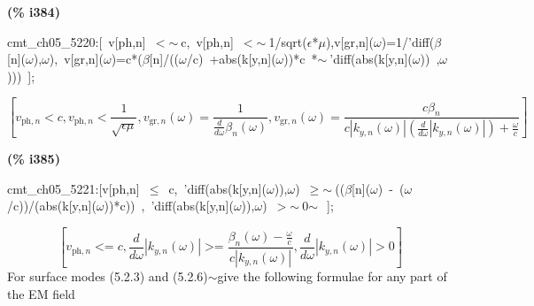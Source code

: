 \documentclass[fleqn]{article}
\begin{document}
\noindent
\begin{minipage}[t]{4.000000em}\color{red}\bfseries
(\% i384)	
\end{minipage}
\begin{minipage}[t]{\textwidth}\color{blue}
cmt\_ch05\_5220:[\ v[ph,n]\ \ensuremath{<}\ensuremath{\sim\ }c,\ v[ph,n]\ \ensuremath{<}\ensuremath{\sim\ }1/sqrt(\ensuremath{\epsilon}*\ensuremath{\mu}),v[gr,n](\ensuremath{\omega})=1/'diff(\ensuremath{\beta}[n](\ensuremath{\omega}),\ensuremath{\omega}),\ v[gr,n](\ensuremath{\omega})=c*(\ensuremath{\beta}[n]/((\ensuremath{\omega}/c)\ +abs(k[y,n](\ensuremath{\omega}))*c\ *\ensuremath{\sim\ }'diff(abs(k[y,n](\ensuremath{\omega}))\ ,\ensuremath{\omega})))\ ];
\end{minipage}
\[\displaystyle \tag{\% o384} 
\operatorname{[}{v_{\ensuremath{\mathrm{ph}},n}}\operatorname{<  }c\operatorname{,}{v_{\ensuremath{\mathrm{ph}},n}}\operatorname{<  }\frac{1}{\sqrt{\epsilon  \mu }}\operatorname{,}{v_{\ensuremath{\mathrm{gr}},n}}\left( \omega \right) =\frac{1}{\frac{d}{d \omega } {{\beta }_n}\left( \omega \right) }\operatorname{,}{v_{\ensuremath{\mathrm{gr}},n}}\left( \omega \right) =
\frac{c {{\beta }_n}}{c \left| {k_{y,n}}\left( \omega \right) \right|  \left( \frac{d}{d \omega } \left| {k_{y,n}}\left( \omega \right) \right| \right) +\frac{\omega }{c}}\operatorname{]}\mbox{}
\]


\noindent
\begin{minipage}[t]{4.000000em}\color{red}\bfseries
(\% i385)	
\end{minipage}
\begin{minipage}[t]{\textwidth}\color{blue}
cmt\_ch05\_5221:[v[ph,n]\ \ensuremath{\leq}\ c,\ 'diff(abs(k[y,n](\ensuremath{\omega})),\ensuremath{\omega})\ \ensuremath{\geq}\ensuremath{\sim\ }((\ensuremath{\beta}[n](\ensuremath{\omega})\ -\ (\ensuremath{\omega}/c))/(abs(k[y,n](\ensuremath{\omega}))*c))\ ,\ 'diff(abs(k[y,n](\ensuremath{\omega})),\ensuremath{\omega})\ \ensuremath{>}\ensuremath{\sim\ }0\ensuremath{\sim\ }\ ];
\end{minipage}
\[\displaystyle \tag{\% o385} 
\left[ {v_{\ensuremath{\mathrm{ph}},n}}\operatorname{<  =}c\operatorname{,}\frac{d}{d \omega } \left| {k_{y,n}}\left( \omega \right) \right| \operatorname{>  =}\frac{{{\beta }_n}\left( \omega \right) -\frac{\omega }{c}}{c \left| {k_{y,n}}\left( \omega \right) \right| }\operatorname{,}\frac{d}{d \omega } \left| {k_{y,n}}\left( \omega \right) \right| \operatorname{>  }0\right] \mbox{}
\]
For surface modes (5.2.3) and (5.2.6)\ensuremath{\sim }give the following formulae for any part of the EM field
\end{document}
